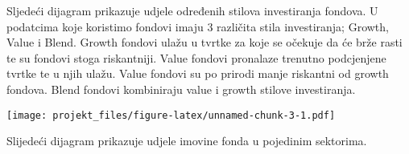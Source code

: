 \documentclass[
]{article}
\newenvironment{Shaded}{\begin{snugshade}}{\end{snugshade}}
\newcommand{\DataTypeTok}[1]{\textcolor[rgb]{0.13,0.29,0.53}{#1}}
\newcommand{\DecValTok}[1]{\textcolor[rgb]{0.00,0.00,0.81}{#1}}
\newcommand{\KeywordTok}[1]{\textcolor[rgb]{0.13,0.29,0.53}{\textbf{#1}}}
\newcommand{\NormalTok}[1]{#1}
\newcommand{\OperatorTok}[1]{\textcolor[rgb]{0.81,0.36,0.00}{\textbf{#1}}}
\newcommand{\StringTok}[1]{\textcolor[rgb]{0.31,0.60,0.02}{#1}}
\begin{document}
Sljedeći dijagram prikazuje udjele određenih stilova investiranja
fondova. U podatcima koje koristimo fondovi imaju 3 različita stila
investiranja; Growth, Value i Blend. Growth fondovi ulažu u tvrtke za
koje se očekuje da će brže rasti te su fondovi stoga riskantniji. Value
fondovi pronalaze trenutno podcjenjene tvrtke te u njih ulažu. Value
fondovi su po prirodi manje riskantni od growth fondova. Blend fondovi
kombiniraju value i growth stilove investiranja.

\begin{Shaded}
\end{Shaded}

\texttt{[image: projekt\_files/figure-latex/unnamed-chunk-3-1.pdf]}

Slijedeći dijagram prikazuje udjele imovine fonda u pojedinim sektorima.
\end{document}

